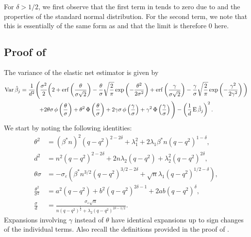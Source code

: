 For \(\delta > 1/2\), we first observe that the first term in
 tends to zero due to  and
the properties of the standard normal distribution. For the second term, we note that this
is essentially of the same form as  and that the limit is
therefore 0 here.

\subsection{Proof of }\label{sec:classbalance-variance-proof}

The variance of the elastic net estimator is given by
\begin{multline}
  \label{eq:varthm-var}
  \operatorname{Var} \hat{\beta}_j = \frac{1}{d^2}\Bigg( \frac{\sigma^2}{2}\bigg(2 + \operatorname{erf}\left(\frac{\theta}{\sigma \sqrt{2}}\right) - \frac{\theta}{\sigma}\sqrt{\frac{2}{\pi}} \exp\left(-\frac{\theta^2}{2\sigma^2}\right) + \operatorname{erf}\left(\frac{\gamma}{\sigma\sqrt{2}}\right) - \frac{\gamma}{\sigma} \sqrt{\frac{2}{\pi}} \exp\left(- \frac{\gamma^2}{2\gamma^2}\right)\bigg) \\
  + 2\theta\sigma \operatorname{\phi}\left(\frac{\theta}{\sigma}\right) + \theta^2 \operatorname{\Phi}\left(\frac{\theta}{\sigma}\right) + 2\gamma \sigma \operatorname{\phi}\left(\frac{\gamma}{\sigma}\right) + \gamma^2 \operatorname{\Phi}\left(\frac{\gamma}{\sigma}\right) \Bigg)
  - \left(\frac{1}{d}\operatorname{E} \hat{\beta}_j\right)^2.
\end{multline}
We start by noting the following identities:
\[
  \begin{aligned}
    \theta^2                  & = \left(\beta^* n\right)^2 (q-q^2)^{2-2\delta} + \lambda_1^2 + 2\lambda_1 \beta^* n(q-q^2)^{1-\delta},                \\
    d^2                       & = n^2(q -q^2)^{2 - 2\delta} + 2n\lambda_2 (q-q^2) + \lambda_2^2 (q-q^2)^{2\delta},                                    \\
    \theta \sigma             & =  -\sigma_\varepsilon\left(\beta^* n^{3/2}(q- q^2)^{3/2-2\delta} + \sqrt{n} \lambda_1 (q-q^2)^{1/2 - \delta}\right), \\
    \frac{\theta^2}{\sigma^2} & = a^2(q-q^2) + b^2(q-q^2)^{2\delta - 1} + 2ab (q -q^2)^\delta,                                                        \\
    \frac{\sigma}{d}          & = \frac{\sigma_\varepsilon \sqrt{n}}{n(q-q^2)^\frac{1}{2} + \lambda_2 (q-q^2)^{2\delta - 1/2}}.
  \end{aligned}
\]
Expansions involving \(\gamma\) instead of \(\theta\) have identical expansions up to sign
changes of the individual terms. Also recall the definitions provided in the proof of
.

